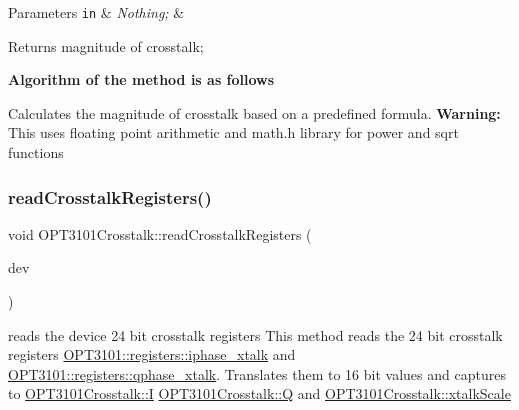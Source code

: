 \begin{DoxyParams}[1]{Parameters}
\mbox{\tt in}  & {\em Nothing;} & \\
\hline
\end{DoxyParams}
\begin{DoxyReturn}{Returns}
magnitude of crosstalk; 
\end{DoxyReturn}
{\bfseries Algorithm of the method is as follows}


\begin{DoxyItemize}
\item Calculates the magnitude of crosstalk based on a predefined formula. {\bfseries Warning\+:} This uses floating point arithmetic and math.\+h library for power and sqrt functions 
\end{DoxyItemize}\mbox{\label{class_o_p_t3101_crosstalk_a87b0ff4559660ea148e5bff1dff68331}} 
\subsubsection{\texorpdfstring{read\+Crosstalk\+Registers()}{readCrosstalkRegisters()}}
{\footnotesize\ttfamily void O\+P\+T3101\+Crosstalk\+::read\+Crosstalk\+Registers (\begin{DoxyParamCaption}\item[{\mbox{\hyperlink{class_o_p_t3101device}{O\+P\+T3101device}} $\ast$}]{dev }\end{DoxyParamCaption})}



reads the device 24 bit crosstalk registers This method reads the 24 bit crosstalk registers \mbox{\hyperlink{class_o_p_t3101_1_1registers_ae87864da6c35bed7c34ebf5f26ba4513}{O\+P\+T3101\+::registers\+::iphase\+\_\+xtalk}} and \mbox{\hyperlink{class_o_p_t3101_1_1registers_ad94d98dfb26313a9d32c5c2c0c673693}{O\+P\+T3101\+::registers\+::qphase\+\_\+xtalk}}. Translates them to 16 bit values and captures to \mbox{\hyperlink{class_o_p_t3101_crosstalk_a382c8271e35b33821b22d612466c96c7}{O\+P\+T3101\+Crosstalk\+::I}} \mbox{\hyperlink{class_o_p_t3101_crosstalk_a0454e10774015dd2e941f9284ea516da}{O\+P\+T3101\+Crosstalk\+::Q}} and \mbox{\hyperlink{class_o_p_t3101_crosstalk_a5a84d979d127f7624e6f19830b739d5e}{O\+P\+T3101\+Crosstalk\+::xtalk\+Scale}} 


